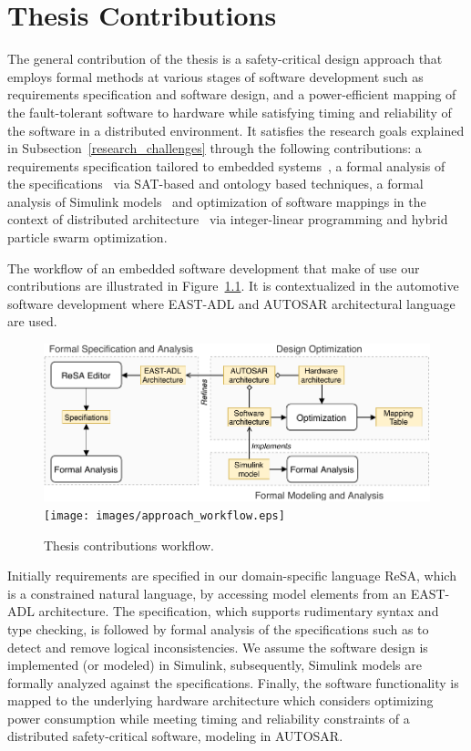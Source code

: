 \chapter{Thesis Contributions}
The general contribution of the thesis is a safety-critical design approach that employs formal methods at various stages of software development such as requirements specification and software design, and a power-efficient mapping of the fault-tolerant software to hardware while satisfying timing and reliability of the software in a distributed environment. It satisfies the research goals explained in Subsection~\ref{research_challenges} through the following contributions: a requirements specification tailored to embedded systems~\cite{Mahmud2015ReSA:Systems}\cite{resatool}, a formal analysis of the specifications~\cite{resatool}\cite{Mahmud2017SpecificationLogic} via SAT-based and ontology based techniques, a formal analysis of Simulink models~\cite{Filipovikj2018SimppaalModels} and optimization of software mappings in the context of distributed architecture~\cite{Mahmud5222}\cite{Mahmud2019Power-awareOptimization} via integer-linear programming and hybrid particle swarm optimization. 

The workflow of an embedded software development that make of use our contributions are illustrated in Figure~\ref{fig_workflow}. It is contextualized in the automotive software development where EAST-ADL and AUTOSAR architectural language are used. 
\begin{figure}[h]
	\centering
	\ifpdf
	\includegraphics[width=\linewidth]{images/approach_workflow}
	\else
	\texttt{[image: images/approach\_workflow.eps]}
	\fi
	\caption{Thesis contributions workflow.} 
	\label{fig_workflow}
\end{figure}

Initially requirements are specified in our domain-specific language ReSA, which is a constrained natural language, by accessing model elements from an EAST-ADL architecture. The specification, which supports rudimentary syntax and type checking, is followed by formal analysis of the specifications such as to detect and remove logical inconsistencies. We assume the software design is implemented (or modeled) in Simulink, subsequently, Simulink models are formally analyzed against the specifications. Finally, the software functionality is mapped to the underlying hardware architecture which considers optimizing power consumption while meeting timing and reliability constraints of a distributed safety-critical software, modeling in AUTOSAR.

